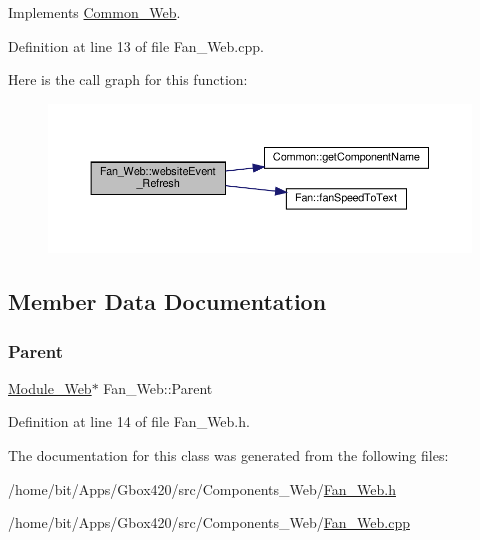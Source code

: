 Implements \hyperlink{class_common___web_aaca7c54fdcf908e4e1256b7b1f6fc212}{Common\+\_\+\+Web}.



Definition at line 13 of file Fan\+\_\+\+Web.\+cpp.

Here is the call graph for this function\+:
\nopagebreak
\begin{figure}[H]
\begin{center}
\leavevmode
\includegraphics[width=350pt]{class_fan___web_a328af0b2469de198e88f0dd51758a5cb_cgraph}
\end{center}
\end{figure}


\subsection{Member Data Documentation}
\mbox{\label{class_fan___web_ad9f5144b9db9c1194514a3527a92d4d1}} 
\subsubsection{\texorpdfstring{Parent}{Parent}}
{\footnotesize\ttfamily \hyperlink{class_module___web}{Module\+\_\+\+Web}$\ast$ Fan\+\_\+\+Web\+::\+Parent\hspace{0.3cm}{\ttfamily [protected]}}



Definition at line 14 of file Fan\+\_\+\+Web.\+h.



The documentation for this class was generated from the following files\+:\begin{DoxyCompactItemize}
\item 
/home/bit/\+Apps/\+Gbox420/src/\+Components\+\_\+\+Web/\hyperlink{_fan___web_8h}{Fan\+\_\+\+Web.\+h}\item 
/home/bit/\+Apps/\+Gbox420/src/\+Components\+\_\+\+Web/\hyperlink{_fan___web_8cpp}{Fan\+\_\+\+Web.\+cpp}\end{DoxyCompactItemize}
